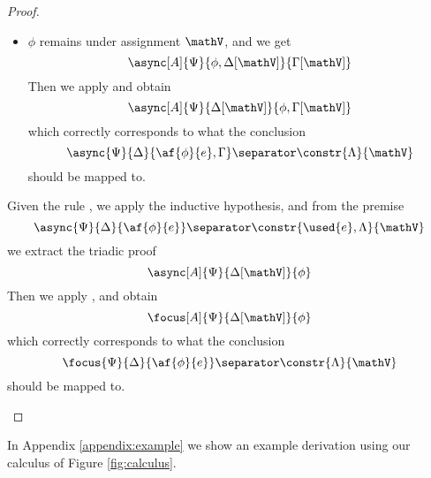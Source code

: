 \begin{proof}
\begin{itemize}
\begin{itemize}
				\item $\phi$ remains under assignment $\mathV$, and we get
					$$ \async[A]{\Psi}{\phi, \Delta[\mathV]}{\Gamma[\mathV]} $$
					Then we apply \derRule[A]{\displaytodelta} and obtain
					$$ \async[A]{\Psi}{\Delta[\mathV]}{\phi, \Gamma[\mathV]} $$
					which correctly corresponds to what the conclusion
					$$ \async{\Psi}{\Delta}{\af{\phi}{e}, \Gamma} \separator \constr{\Lambda}{\mathV} $$
					should be mapped to.
			\end{itemize}
		\indCase{\displaytoasy} Given the rule \derRule{\displaytoasy}, we apply the inductive hypothesis, and from the premise
			$$ \async{\Psi}{\Delta}{\af{\phi}{e}} \separator \constr{\used{e}, \Lambda}{\mathV} $$
			we extract the triadic proof
			$$ \async[A]{\Psi}{\Delta[\mathV]}{\phi} $$
			Then we apply \derRule[A]{\displaytoasy}, and obtain
			$$ \focus[A]{\Psi}{\Delta[\mathV]}{\phi} $$
			which correctly corresponds to what the conclusion 
			$$ \focus{\Psi}{\Delta}{\af{\phi}{e}} \separator \constr{\Lambda}{\mathV} $$
			should be mapped to.
	\end{itemize}
\end{proof}
In Appendix \ref{appendix:example} we show an example derivation using our calculus of Figure \ref{fig:calculus}.



